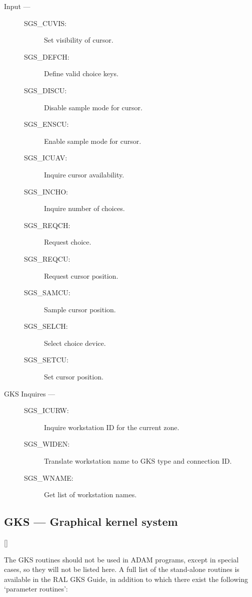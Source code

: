 \begin{description}
\item [Input ---]

\begin{description}
\item [SGS\_CUVIS:]  Set visibility of cursor.
\item [SGS\_DEFCH:]  Define valid choice keys.
\item [SGS\_DISCU:]  Disable sample mode for cursor.
\item [SGS\_ENSCU:]  Enable sample mode for cursor.
\item [SGS\_ICUAV:]  Inquire cursor availability.
\item [SGS\_INCHO:]  Inquire number of choices.
\item [SGS\_REQCH:]  Request choice.
\item [SGS\_REQCU:]  Request cursor position.
\item [SGS\_SAMCU:]  Sample cursor position.
\item [SGS\_SELCH:]  Select choice device.
\item [SGS\_SETCU:]  Set cursor position.
\end{description}

\item [GKS Inquires ---]

\begin{description}
\item [SGS\_ICURW:]  Inquire workstation ID for the current zone.
\item [SGS\_WIDEN:]  Translate workstation name to GKS type and connection ID.
\item [SGS\_WNAME:]  Get list of workstation names.
\end{description}

\end{description}

\newpage

\subsection{GKS --- Graphical kernel system}

\vspace{-9mm}

\hfill []

\vspace{2mm}

The GKS routines should not be used in ADAM programs, except in special cases,
so they will not be listed here.
A full list of the stand-alone routines is available in the RAL GKS Guide, in
addition to which there exist the following `parameter routines':

